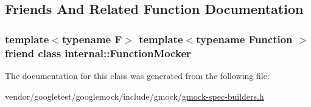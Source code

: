 \subsection{Friends And Related Function Documentation}
\subsubsection[{\texorpdfstring{internal\+::\+Function\+Mocker}{internal::FunctionMocker}}]{\setlength{\rightskip}{0pt plus 5cm}template$<$typename F$>$ template$<$typename Function $>$ friend class {\bf internal\+::\+Function\+Mocker}\hspace{0.3cm}{\ttfamily [friend]}}\hypertarget{classtesting_1_1internal_1_1MockSpec_a6980863fff8693124aff79c507f87d45}{}\label{classtesting_1_1internal_1_1MockSpec_a6980863fff8693124aff79c507f87d45}


The documentation for this class was generated from the following file\+:\begin{DoxyCompactItemize}
\item 
vendor/googletest/googlemock/include/gmock/\hyperlink{gmock-spec-builders_8h}{gmock-\/spec-\/builders.\+h}\end{DoxyCompactItemize}
